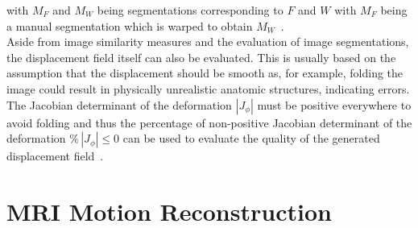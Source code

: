 \documentclass[english,version-2022-01]{uzl-thesis} %
\begin{document}
with $M_F$ and $M_W$ being segmentations corresponding to $F$ and $W$ with $M_F$ being a manual segmentation which is warped to obtain $M_W$~\cite{NiftiReg}.\\
Aside from image similarity measures and the evaluation of image segmentations, the displacement field itself can also be evaluated. This is usually based on the assumption that the displacement should be smooth as, for example, folding the image could result in physically unrealistic anatomic structures, indicating errors. The Jacobian determinant of the deformation $|J_{\phi}|$ must be positive everywhere to avoid folding and thus the percentage of non-positive Jacobian determinant of the deformation $\% \, |J_{\phi}|\leq0$ can be used to evaluate the quality of the generated displacement field~\cite{Chen2023}.

\section{MRI Motion Reconstruction} \label{Sec:MRI_MotionReconstruction}
\end{document}
